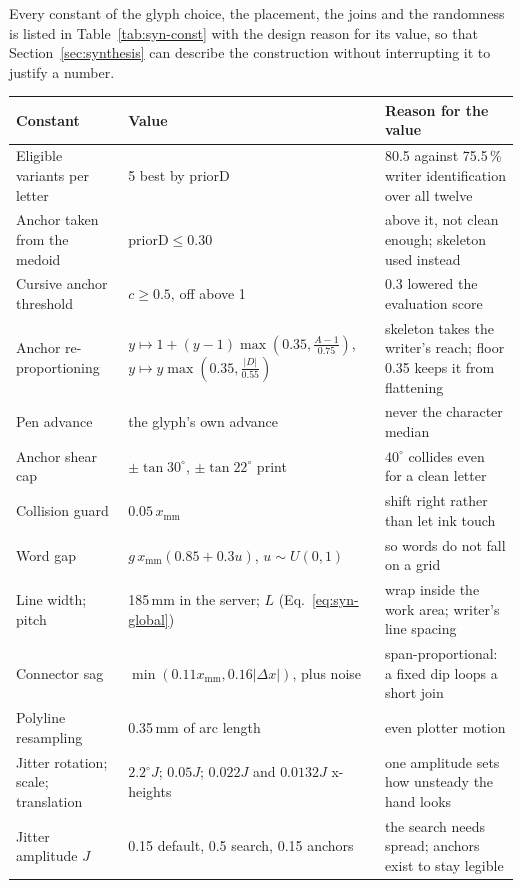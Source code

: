 Every constant of the glyph choice, the placement, the joins and the randomness is listed in Table~\ref{tab:syn-const} with the design reason for its value, so that Section~\ref{sec:synthesis} can describe the construction without interrupting it to justify a number.

\begin{table}[!htbp]
\centering
\fontsize{8}{9.6}\selectfont
\setlength{\tabcolsep}{4pt}
\begin{tabularx}{\linewidth}{|p{3.5cm}|p{3.2cm}|X|}
\hline
\textbf{Constant} & \textbf{Value} & \textbf{Reason for the value} \\
\hline
Eligible variants per letter & 5 best by $\mathrm{priorD}$ & 80.5 against 75.5\,\% writer identification over all twelve \\
Anchor taken from the medoid & $\mathrm{priorD}\le0.30$ & above it, not clean enough; skeleton used instead \\
Cursive anchor threshold & $c\ge0.5$, off above 1 & 0.3 lowered the evaluation score \\
Anchor re-proportioning & $y\mapsto1+(y-1)\max(0.35,\frac{A-1}{0.75})$, $y\mapsto y\max(0.35,\frac{|D|}{0.55})$ & skeleton takes the writer's reach; floor 0.35 keeps it from flattening \\
Pen advance & the glyph's own advance & never the character median \\
Anchor shear cap & $\pm\tan30^\circ$, $\pm\tan22^\circ$ print & $40^\circ$ collides even for a clean letter \\
Collision guard & $0.05\,x_{\mathrm{mm}}$ & shift right rather than let ink touch \\
Word gap & $g\,x_{\mathrm{mm}}(0.85+0.3u)$, $u\sim U(0,1)$ & so words do not fall on a grid \\
Line width; pitch & 185\,mm in the server; $L$ (Eq.~\ref{eq:syn-global}) & wrap inside the work area; writer's line spacing \\
Connector sag & $\min(0.11x_{\mathrm{mm}},0.16|\Delta x|)$, plus noise & span-proportional: a fixed dip loops a short join \\
Polyline resampling & 0.35\,mm of arc length & even plotter motion \\
Jitter rotation; scale; translation & $2.2^\circ J$; $0.05J$; $0.022J$ and $0.0132J$ x-heights & one amplitude sets how unsteady the hand looks \\
Jitter amplitude $J$ & 0.15 default, 0.5 search, 0.15 anchors & the search needs spread; anchors exist to stay legible \\

\end{tabularx}
\end{table}
